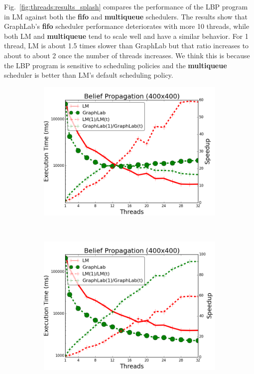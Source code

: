 Fig.~\ref{fig:threads:results_splash} compares the performance of the LBP
program in LM against both the \textbf{fifo} and \textbf{multiqueue} schedulers.
The results show that GraphLab's \textbf{fifo} scheduler performance
deteriorates with more 10 threads, while both LM and \textbf{multiqueue} tend to
scale well and have a similar behavior. For 1 thread, LM is about 1.5 times
slower than GraphLab but that ratio increases to about to about 2 once the
number of threads increases. We think this is because the LBP program is
sensitive to scheduling policies and the \textbf{multiqueue} scheduler is better
than LM's default scheduling policy.

\begin{figure}[]
        \centering
        \begin{subfigure}[b]{\plotsize\textwidth}
           \includegraphics[width=\textwidth]{experiments/threads/cmp-fifo-belief-propagation-400.png}
           \label{fig:threads:splash_fifo}
        \end{subfigure}
        ~ ~
        \begin{subfigure}[b]{\plotsize\textwidth}
           \includegraphics[width=\textwidth]{experiments/threads/cmp-multi-belief-propagation-400.png}

\end{subfigure}
\end{figure}
